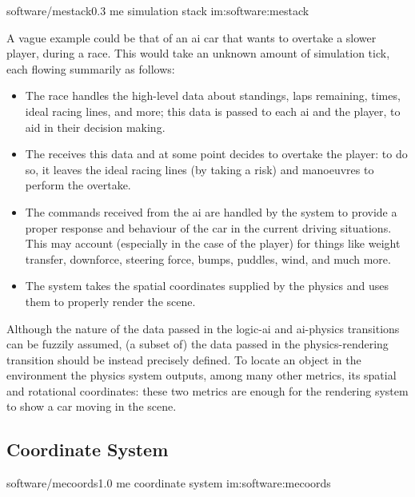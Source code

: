 \begin{image}
	{software/mestack}{0.3}
	{\gls{me} simulation stack}
	{im:software:mestack}
	{}
\end{image}

A vague example could be that of an \gls{ai} car that wants to overtake a slower player, during a race. This would take an unknown amount of simulation tick, each flowing summarily as follows:

\begin{itemize}
	\item The race  handles the high-level data about standings, laps remaining, times, ideal racing lines, and more; this data is passed to each \gls{ai} and the player, to aid in their decision making.
	\item The  receives this data and at some point decides to overtake the player: to do so, it leaves the ideal racing lines (by taking a risk) and manoeuvres to perform the overtake.
	\item The commands received from the \gls{ai} are handled by the  system to provide a proper response and behaviour of the car in the current driving situations. This may account (especially in the case of the player) for things like weight transfer, downforce, steering force, bumps, puddles, wind, and much more.
	\item The  system takes the spatial coordinates supplied by the physics and uses them to properly render the scene.
\end{itemize}

Although the nature of the data passed in the logic-\gls{ai} and \gls{ai}-physics transitions can be fuzzily assumed, (a subset of) the data passed in the physics-rendering transition should be instead precisely defined. To locate an object in the environment the physics system outputs, among many other metrics, its spatial and rotational coordinates: these two metrics are enough for the rendering system to show a car moving in the scene.

\subsection{Coordinate System} %

\begin{image}
	{software/mecoords}{1.0}
	{\gls{me} coordinate system}
	{im:software:mecoords}
	{}
\end{image}

